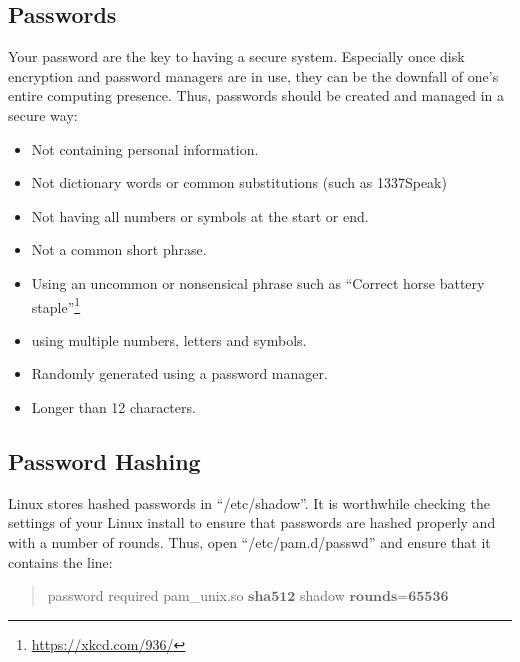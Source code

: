 \documentclass[a4paper,11pt]{report}
\begin{document}
		\subsection{Passwords} 
			Your password are the key to having a secure system. 
			Especially once disk encryption and password managers are in use, they can be the downfall of one's entire computing presence. 
			Thus, passwords should be created and managed in a secure way:
			\begin{itemize}
				\item Not containing personal information.
				\item Not dictionary words or common substitutions (such as 1337Speak)
				\item Not having all numbers or symbols at the start or end. 
				\item Not a common short phrase. 
				\item Using an uncommon or nonsensical phrase such as ``Correct horse battery staple''\footnote{\url{https://xkcd.com/936/}}
				\item using multiple numbers, letters and symbols. 
				\item Randomly generated using a password manager. %
				\item Longer than 12 characters. 
			\end{itemize}
		\subsection{Password Hashing}
			Linux stores hashed passwords in ``/etc/shadow''. 
			It is worthwhile checking the settings of your Linux install to ensure that passwords are hashed properly and with a number of rounds. Thus, open ``/etc/pam.d/passwd'' and ensure that it contains the line:
			\begin{quote}
				password required pam\_unix.so $\textbf{sha512}$ shadow $\textbf{rounds=65536}$
			\end{quote}
\end{document}
